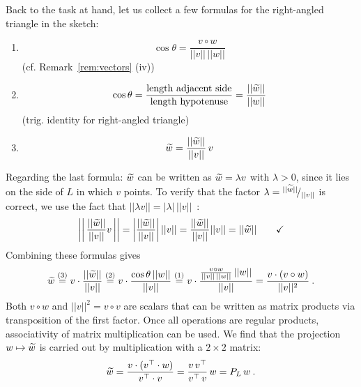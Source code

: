 \begin{application}
	Back to the task at hand, let us collect a few formulas for the right-angled triangle in the sketch:
	\begin{enumerate}
		\item \[ \cos \theta = \frac{ v \circ w }{||v||\,||w||} \]
		\hfill (cf. Remark~\ref{rem:vectors} (iv))
		\item \[ \cos \theta 
		= \frac{\text{length adjacent side}}{\text{length hypotenuse}} 
		= \frac{||\widetilde{w}||}{||w||} \]
		\hfill (trig. identity for right-angled triangle)
		\item \[ \widetilde{w} = \frac{||\widetilde{w}||}{||v||} \, v \]
	\end{enumerate}
	Regarding the last formula: $\widetilde{w}$ can be written as $\widetilde{w}=\lambda v$ with $\lambda > 0$, since it lies on the side of $L$ in which $v$ points. To verify that the factor $\lambda = {}^{||\widetilde{w}||}\!/_{||v||}$ is correct, we use the fact that $||\lambda v||=|\lambda| \,||v||$~:
	\[ \left|\left| \, \frac{||\widetilde{w}||}{||v||} v  \, \right| \right|
	=  \left| \frac{||\widetilde{w}||}{||v||} \right| ||v||
	=  \frac{||\widetilde{w}||}{||v||} ||v||
	= ||\widetilde{w}|| \qquad \text{\checkmark} \]
	Combining these formulas gives
	\begin{equation*}
	\widetilde{w} \stackrel{(3)}{=} v \cdot \frac{||\widetilde{w}||}{||v||}
	\stackrel{(2)}{=} v \cdot \frac{\cos\theta\,||w||}{||v||}
	\stackrel{(1)}{=} v \cdot \frac{\frac{ v \circ w }{||v||\,||w||}\,||w||}{||v||}
	= \frac{v \cdot (v \circ w)}{||v||^2} \:.
	\end{equation*}
	Both $v \circ w$ and $||v||^2 = v \circ v$ are scalars that can be written as matrix products via transposition of the first factor. Once all operations are regular products, associativity of matrix multiplication can be used. We find that the projection $w \mapsto \widetilde{w}$ is carried out by multiplication with a $2 \times 2$ matrix:
	\[ \widetilde{w} = \frac{v \cdot (v^\top \cdot w)}{v^\top \cdot v}
	= \frac{v \, v^\top}{v^\top \, v} \, w  = P_L \, w \:. \]
\end{application}

